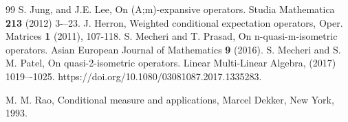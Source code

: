 \documentclass{amsart}
\theoremstyle{definition}\newtheorem{defn}[thm]{Definition}
\theoremstyle{remark}
\numberwithin{equation}{section}
\begin{document}
\begin{thebibliography}{99}
 S. Jung, and J.E. Lee, On (A;m)-expansive operators. Studia Mathematica {\bf213} (2012) 3-–23.
J. Herron, Weighted conditional expectation operators, Oper.
Matrices {\bf 1} (2011), 107-118.
 S. Mecheri and T. Prasad, On n-quasi-m-isometric operators. Asian European Journal of
Mathematics {\bf9} (2016).
 S. Mecheri and S. M. Patel, On quasi-2-isometric operators. Linear Multi-Linear Algebra, (2017) 1019–-1025. https://doi.org/10.1080/03081087.2017.1335283.
%
%


M. M. Rao, Conditional measure and applications, Marcel Dekker,
New York, 1993.

\end{thebibliography}
\end{document}
